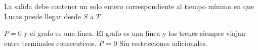 \documentclass{oci}
\begin{document}
\begin{outputDescription}
  La salida debe contener un solo entero correspondiente al tiempo mínimo en que
  Lucas puede llegar desde $S$ a $T$.
\end{outputDescription}

\begin{scoreDescription}
   $P=0$ y el grafo es una línea.
   El grafo es una línea y los trenes siempre viajan entre terminales
  consecutivos.
   $P$ = 0
   Sin restricciones adicionales.
\end{scoreDescription}

\begin{sampleDescription}
\end{sampleDescription}
\end{document}
